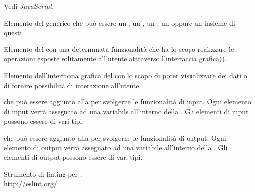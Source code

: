 Vedi \textit{JavaScript}.

Elemento del  generico che può essere un , un , un , un  oppure un insieme di questi.

Elemento del  con una determinata funzionalità che ha lo scopo realizzare le operazioni esposte solitamente all’utente attraverso l’interfaccia grafica().

Elemento dell’interfaccia grafica del  con lo scopo di poter visualizzare dei dati o di fornire possibilità di interazione all’utente.

 che può essere aggiunto alla  per svolgerne le funzionalità di input. Ogni elemento di input verrà assegnato ad una variabile all’interno della . Gli elementi di input possono essere di vari tipi.

 che può essere aggiunto alla  per svolgerne le funzionalità di output. Ogni elemento di output verrà assegnato ad una variabile all’interno della . Gli elementi di output possono essere di vari tipi.

Strumento di linting per .\\
\url{http://eslint.org/}
\clearpage